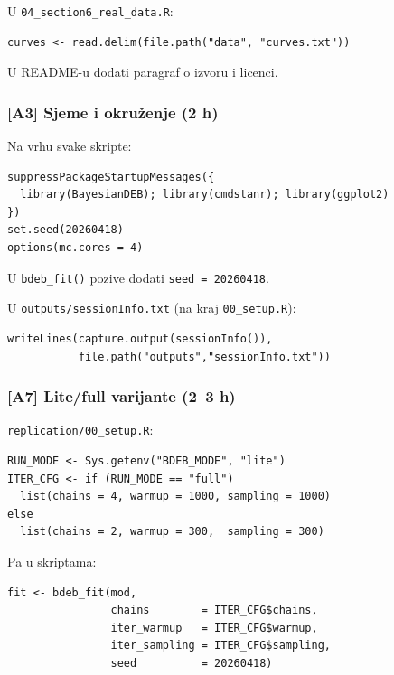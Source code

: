\documentclass[11pt,a4paper]{article}
\newcommand{\file}[1]{\texttt{\small #1}}
\newcommand{\fn}[1]{\texttt{\small #1()}}
\newcommand{\code}[1]{\texttt{\small #1}}
\begin{document}
\noindent U \file{04\_section6\_real\_data.R}:

\begin{lstlisting}
curves <- read.delim(file.path("data", "curves.txt"))
\end{lstlisting}

\noindent U README-u dodati paragraf o izvoru i licenci.

\subsubsection*{[A3] Sjeme i okruženje (2 h)}

Na vrhu svake skripte:

\begin{lstlisting}
suppressPackageStartupMessages({
  library(BayesianDEB); library(cmdstanr); library(ggplot2)
})
set.seed(20260418)
options(mc.cores = 4)
\end{lstlisting}

\noindent U \fn{bdeb\_fit} pozive dodati \code{seed = 20260418}.

\noindent U \file{outputs/sessionInfo.txt} (na kraj
\file{00\_setup.R}):

\begin{lstlisting}
writeLines(capture.output(sessionInfo()),
           file.path("outputs","sessionInfo.txt"))
\end{lstlisting}

\subsubsection*{[A7] Lite/full varijante (2--3 h)}

\file{replication/00\_setup.R}:

\begin{lstlisting}
RUN_MODE <- Sys.getenv("BDEB_MODE", "lite")
ITER_CFG <- if (RUN_MODE == "full")
  list(chains = 4, warmup = 1000, sampling = 1000)
else
  list(chains = 2, warmup = 300,  sampling = 300)
\end{lstlisting}

\noindent Pa u skriptama:

\begin{lstlisting}
fit <- bdeb_fit(mod,
                chains        = ITER_CFG$chains,
                iter_warmup   = ITER_CFG$warmup,
                iter_sampling = ITER_CFG$sampling,
                seed          = 20260418)
\end{lstlisting}
\end{document}
